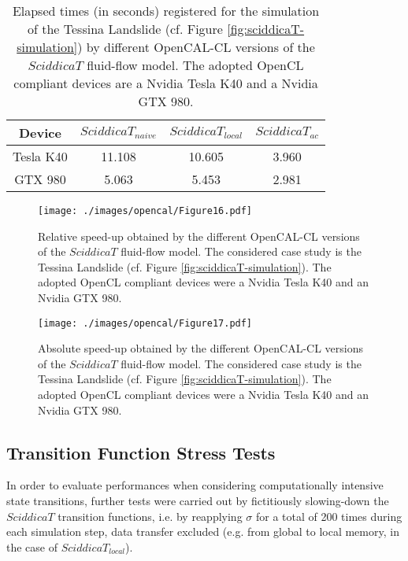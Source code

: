 \begin{table}
	\centering
	\begin{tabular}{cccc}
		\hline Device & $SciddicaT_{naive}$ & $SciddicaT_{local}$ &
		$SciddicaT_{ac}$ \\ \hline Tesla K40 & 11.108 & 10.605 &
		3.960\\ GTX 980 & 5.063 & 5.453 & 2.981\\ \hline
	\end{tabular}
	\caption{Elapsed times (in seconds) registered for the simulation of the
		Tessina Landslide (cf. Figure \ref{fig:sciddicaT-simulation}) by
		different OpenCAL-CL versions of the $SciddicaT$ fluid-flow model. The
		adopted OpenCL compliant devices are a Nvidia Tesla K40 and a Nvidia
		GTX 980.}
	\label{tab:sciddicaT-CL-execution-times}
\end{table}

\begin{figure}
	\begin{center}
		\texttt{[image: ./images/opencal/Figure16.pdf]}
		\caption{Relative speed-up obtained by the different OpenCAL-CL versions of the
			$SciddicaT$ fluid-flow model. The considered case study is the Tessina
			Landslide (cf. Figure \ref{fig:sciddicaT-simulation}). The adopted
			OpenCL compliant devices were a Nvidia Tesla K40 and an Nvidia GTX
			980.}
		\label{gr:sciddicaT-CL-relative-speed-up}
	\end{center}
\end{figure}
\begin{figure}
	\begin{center}
		\texttt{[image: ./images/opencal/Figure17.pdf]}
		\caption{Absolute speed-up obtained by the different OpenCAL-CL versions of the
			$SciddicaT$ fluid-flow model. The considered case study is the Tessina
			Landslide (cf. Figure \ref{fig:sciddicaT-simulation}). The adopted
			OpenCL compliant devices were a Nvidia Tesla K40 and an Nvidia GTX
			980.}
		\label{gr:sciddicaT-CL-absolute-speed-up}
	\end{center}
\end{figure}




\subsection{Transition Function Stress Tests}    
In order to evaluate performances when considering
computationally intensive state transitions, further tests were
carried out by fictitiously slowing-down the $SciddicaT$
transition functions, i.e. by reapplying $\sigma$ for a total of
200 times during each simulation step, data transfer excluded
(e.g. from global to local memory, in the case of
$SciddicaT_{local}$).

